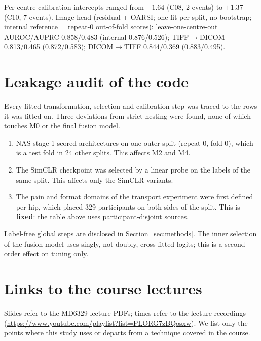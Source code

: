 Per-centre calibration intercepts ranged from $-1.64$ (C08, 2 events) to $+1.37$ (C10, 7 events).
Image head (residual + OARSI; one fit per split, no bootstrap; internal reference = repeat-0 out-of-fold scores):
leave-one-centre-out AUROC/AUPRC 0.858/0.483 (internal 0.876/0.526); TIFF$\to$DICOM 0.813/0.465 (0.872/0.583);
DICOM$\to$TIFF 0.844/0.369 (0.883/0.495).

\section{Leakage audit of the code}
\label{app:audit}
Every fitted transformation, selection and calibration step was traced to the rows it was fitted on. Three deviations
from strict nesting were found, none of which touches M0 or the final fusion model.
\begin{enumerate}[itemsep=0pt]
  \item NAS stage 1 scored architectures on one outer split (repeat 0, fold 0), which is a test fold in 24 other splits.
        This affects M2 and M4.
  \item The SimCLR checkpoint was selected by a linear probe on the labels of the same split. This affects only the
        SimCLR variants.
  \item The pain and format domains of the transport experiment were first defined per hip, which placed 329
        participants on both sides of the split. This is \textbf{fixed}: the table above uses participant-disjoint
        sources.
\end{enumerate}
Label-free global steps are disclosed in Section~\ref{sec:methods}. The inner selection of the fusion model uses
singly, not doubly, cross-fitted logits; this is a second-order effect on tuning only.

\section{Links to the course lectures}
\label{app:lectures}
Slides refer to the MD6329 lecture PDFs; times refer to the lecture recordings
(\url{https://www.youtube.com/playlist?list=PLORG7zBQosxw}). We list only the points where this study uses or departs
from a technique covered in the course.

